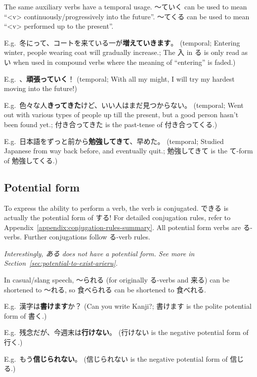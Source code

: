 \documentclass[../nihongo-gakushuu-kyouzai.tex]{subfiles}
\begin{document}
The same auxiliary verbs have a temporal usage. 〜ていく can be used to mean ``<v> continuously/progressively into the future''. 〜てくる can be used to mean ``<v> performed up to the present''.

E.g.\ 冬にって、コートを来ている一が\textbf{増えていきます}。 (temporal; Entering winter, people wearing coat will gradually increase.; The 入 in る is only read as い when used in compound verbs where the meaning of ``entering'' is faded.)

E.g.\ 、\textbf{頑張っていく}！ (temporal; With all my might, I will try my hardest moving into the future!)

E.g.\ 色々な人\textbf{きってきた}けど、いい人はまだ見つからない。 (temporal; Went out with various types of people up till the present, but a good person hasn't been found yet.; 付き合ってきた is the past-tense of 付き合ってくる.)

E.g.\ 日本語をずっと前から\textbf{勉強してきて}、早めた。 (temporal; Studied Japanese from way back before, and eventually quit.; 勉強してきて is the て-form of 勉強してくる.)

\subsection{Potential form} \label{potential-form}
To express the ability to perform a verb, the verb is conjugated. できる is actually the potential form of する! For detailed conjugation rules, refer to Appendix~\ref{appendix:conjugation-rules-summary}. All potential form verbs are る-verbs. Further conjugations follow る-verb rules.

\emph{Interestingly, ある does not have a potential form. See more in Section~\ref{sec:potential-to-exist-arieru}.}

In casual/slang speech, 〜られる (for originally る-verbs and 来る) can be shortened to 〜れる, so 食べられる can be shortened to 食べれる. 

E.g.\ 漢字は\textbf{書けます}か？ (Can you write Kanji?; 書けます is the polite potential form of 書く.)

E.g.\ 残念だが、今週末は\textbf{行けない}。 (行けない is the negative potential form of 行く.)

E.g.\ もう\textbf{信じられない}。 (信じられない is the negative potential form of 信じる.)
\end{document}
